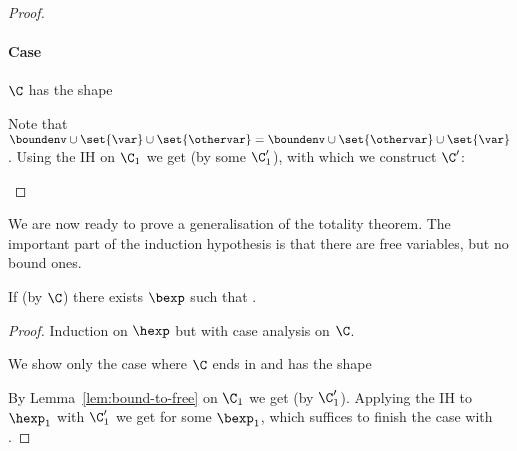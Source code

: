 \begin{proof}
\paragraph{Case \textnormal{}}
$\C$ has the shape
\begin{prooftree}
\end{prooftree}
Note that $\boundenv \cup \set{\var} \cup \set{\othervar} = \boundenv \cup \set{\othervar} \cup \set{\var}$.
Using the IH on $\C_1$ we get  (by some $\C_1'$), with which we construct $\C'$:
\begin{prooftree}
\end{prooftree}

\end{proof}

We are now ready to prove a generalisation of the totality theorem.
The important part of the induction hypothesis is that there are free variables, but no bound ones.

\begin{lemma}
\label{lem:totality}
If \cover{\emptyset}{\benvext}{\hexp} (by $\C$) there exists $\bexp$ such that \trahb{\envnil}{\benvext}{\bexp}{\hexp}.
\end{lemma}


\begin{proof}
Induction on $\hexp$ but with case analysis on $\C$.

We show only the case where $\C$ ends in  and has the shape
\begin{prooftree}
\end{prooftree}
By Lemma~\ref{lem:bound-to-free} on $\C_1$ we get  (by $\C_1'$).
Applying the IH to $\hexp_1$ with $\C_1'$ we get  for some $\bexp_1$, which suffices to finish the case with .

\end{proof}

